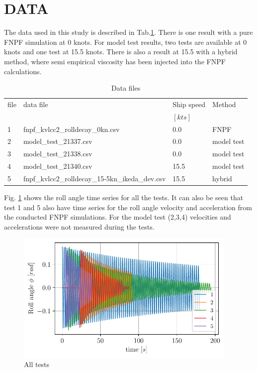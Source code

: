 \section*{DATA}\label{data}
The data used in this study is described in
Tab.\ref{tab:data_files}. There is one result with a pure FNPF
simulation at 0 knots. For model test results, two tests are available
at 0 knots and one test at 15.5 knots. There is also a result at 15.5
with a hybrid method, where semi empirical viscosity has been injected
into the FNPF calculations.
\begin{table}[H]
\scriptsize
\center
\caption{Data files}
\label{tab:data_files}
\begin{tabular}{|l|l|l|l|}
\hline\addlinespace
file & data file & Ship speed & Method\\
&  & $[kts]$ & \\
\hline1 & fnpf_kvlcc2_rolldecay_0kn.csv & 0.0 & FNPF\\
2 & model_test_21337.csv & 0.0 & model test\\
3 & model_test_21338.csv & 0.0 & model test\\
4 & model_test_21340.csv & 15.5 & model test\\
5 & fnpf_kvlcc2_rolldecay_15-5kn_ikeda_dev.csv & 15.5 & hybrid\\
\hline
\end{tabular}
\end{table}
Fig. \ref{fig:all_tests} shows the roll angle time series for
all the tests. It can also be seen that test 1 and 5 also have time
series for the roll angle velocity and acceleration from the conducted
FNPF simulations. For the model test (2,3,4) velocities and
accelerations were not measured during the tests.
\begin{figure}[H]
\begin{center}\includegraphics[width = 0.95\textwidth]{figures/all_tests.pdf}\end{center}
\vspace{-0.7cm}
\caption{All tests}
\label{fig:all_tests}
\end{figure}
